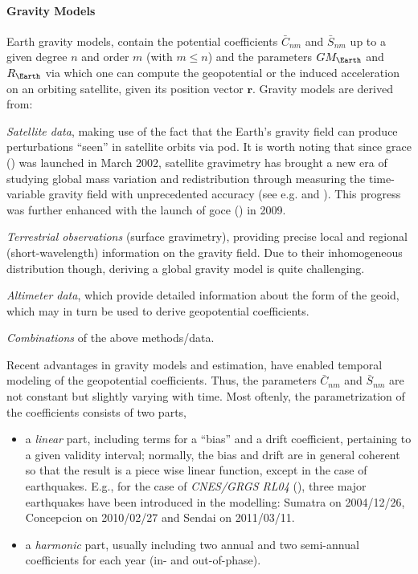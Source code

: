 \paragraph{Gravity Models}\label{par:gravity-models}

Earth gravity models, contain the potential coefficients $\bar{C}_{nm}$ and $\bar{S}_{nm}$ 
up to a given degree $n$ and order $m$ (with $m \le n$) and the parameters $GM_{\Earth}$ 
and $R_{\Earth}$ via which one can compute the geopotential or the induced acceleration 
on an orbiting satellite, given its position vector $\bm{r}$. Gravity models are derived from:
\begin{description}
  \item \emph{Satellite data}, making use of the fact that the Earth's gravity field 
    can produce perturbations ``seen'' in satellite orbits via \gls{pod}. It is worth 
    noting that since \gls{grace} (\cite{Tapley2004b}) was launched in March 2002, satellite 
    gravimetry has brought a new era of studying global mass variation and redistribution 
    through measuring the time-variable gravity field with unprecedented accuracy 
    (see e.g. \cite{Chen2022} and \cite{Jaggi2023}). This progress was further enhanced 
    with the launch of \gls{goce} (\cite{Johannessen2003}) in 2009.
  \item \emph{Terrestrial observations} (surface gravimetry), providing precise local 
    and regional (short-wavelength) information on the gravity field. Due to their 
    inhomogeneous distribution though, deriving a global gravity model is quite challenging.
  \item \emph{Altimeter data}, which provide detailed information about the form of the 
    geoid, which may in turn be used to derive geopotential coefficients.
  \item \emph{Combinations} of the above methods/data.
\end{description}

Recent advantages in gravity models and estimation, have enabled temporal modeling 
of the geopotential coefficients. Thus, the parameters $\bar{C}_{nm}$ and 
$\bar{S}_{nm}$ are not constant but slightly varying with time. Most oftenly, the 
parametrization of the coefficients consists of two parts, 
\begin{itemize}
  \item a \emph{linear} part, including terms for a ``bias'' and a drift coefficient, pertaining 
    to a given validity interval; normally, the bias and drift are in general coherent 
    so that the result is a piece wise linear function, except in the case of earthquakes.
    E.g., for the case of \emph{CNES/GRGS RL04} (\cite{lemoine-rl04}), three major 
    earthquakes have been introduced in the modelling: Sumatra on 2004/12/26, Concepcion 
    on 2010/02/27 and Sendai on 2011/03/11.
  \item a \emph{harmonic} part, usually including two annual and two semi-annual 
    coefficients for each year (in- and out-of-phase).
\end{itemize}

